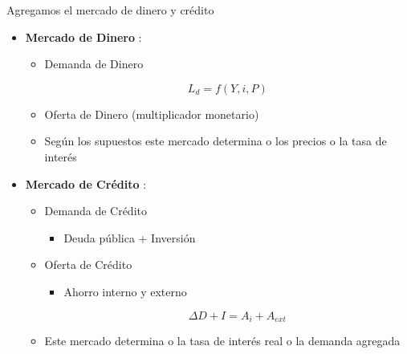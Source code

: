 \documentclass{beamer}
\begin{document}
\begin{frame}{Agregamos el mercado de dinero y crédito}

    \begin{itemize}
        \item \textbf{Mercado de Dinero} \faMoney:
            \begin{itemize}
            \item Demanda de Dinero
            
            \begin{center}
            \begin{boxA}
                    $$ L_{d}=f(Y, i, P) $$
             \end{boxA}
             \end{center}
            
            \item Oferta de Dinero (multiplicador monetario)
            \item Según los supuestos este mercado determina o los precios o la tasa de interés
            \end{itemize}
        
        \item \textbf{Mercado de Crédito} \faBank:
            \begin{itemize}
             \item Demanda de Crédito
                \begin{itemize}
                \item Deuda pública + Inversión
                \end{itemize}
              \item Oferta de Crédito
                \begin{itemize}
                \item Ahorro interno y externo

            \begin{center}
            \begin{tcolorbox}[width=2in, boxsep=0pt, left=0pt, right=0pt, top=0pt,]%
                    $$ \Delta D+I=A_{i}+A_{e x t} $$
             \end{tcolorbox}
             \end{center}
                \end{itemize}
            \item Este mercado determina o la tasa de interés real o la demanda agregada
            \end{itemize}
    \end{itemize}

\end{frame}
\end{document}
